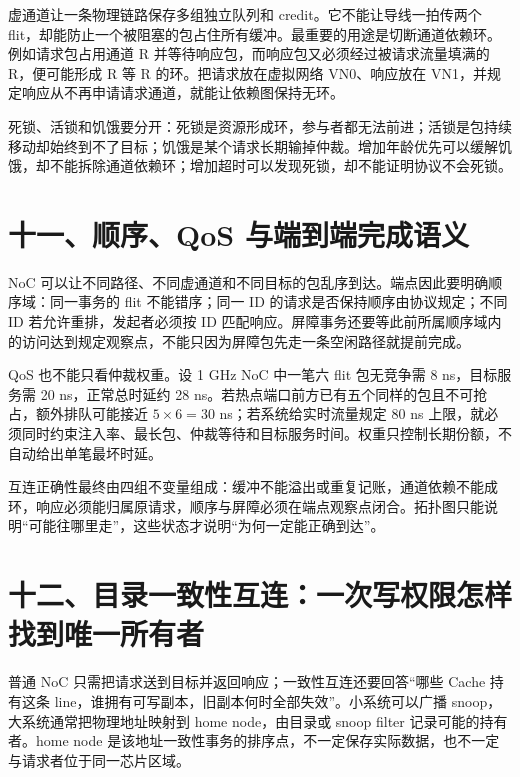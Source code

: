 
虚通道让一条物理链路保存多组独立队列和 credit。它不能让导线一拍传两个 flit，却能防止一个被阻塞的包占住所有缓冲。最重要的用途是切断通道依赖环。例如请求包占用通道 R 并等待响应包，而响应包又必须经过被请求流量填满的 R，便可能形成 R 等 R 的环。把请求放在虚拟网络 VN0、响应放在 VN1，并规定响应从不再申请请求通道，就能让依赖图保持无环。

死锁、活锁和饥饿要分开：死锁是资源形成环，参与者都无法前进；活锁是包持续移动却始终到不了目标；饥饿是某个请求长期输掉仲裁。增加年龄优先可以缓解饥饿，却不能拆除通道依赖环；增加超时可以发现死锁，却不能证明协议不会死锁。

\section{十一、顺序、QoS 与端到端完成语义}

NoC 可以让不同路径、不同虚通道和不同目标的包乱序到达。端点因此要明确顺序域：同一事务的 flit 不能错序；同一 ID 的请求是否保持顺序由协议规定；不同 ID 若允许重排，发起者必须按 ID 匹配响应。屏障事务还要等此前所属顺序域内的访问达到规定观察点，不能只因为屏障包先走一条空闲路径就提前完成。

QoS 也不能只看仲裁权重。设 1 GHz NoC 中一笔六 flit 包无竞争需 8 ns，目标服务需 20 ns，正常总时延约 28 ns。若热点端口前方已有五个同样的包且不可抢占，额外排队可能接近 $5\times6=30$ ns；若系统给实时流量规定 80 ns 上限，就必须同时约束注入率、最长包、仲裁等待和目标服务时间。权重只控制长期份额，不自动给出单笔最坏时延。

\begin{keyidea}
互连正确性最终由四组不变量组成：缓冲不能溢出或重复记账，通道依赖不能成环，响应必须能归属原请求，顺序与屏障必须在端点观察点闭合。拓扑图只能说明“可能往哪里走”，这些状态才说明“为何一定能正确到达”。
\end{keyidea}








\section{十二、目录一致性互连：一次写权限怎样找到唯一所有者}

普通 NoC 只需把请求送到目标并返回响应；一致性互连还要回答“哪些 Cache 持有这条 line，谁拥有可写副本，旧副本何时全部失效”。小系统可以广播 snoop，大系统通常把物理地址映射到 home node，由目录或 snoop filter 记录可能的持有者。home node 是该地址一致性事务的排序点，不一定保存实际数据，也不一定与请求者位于同一芯片区域。


